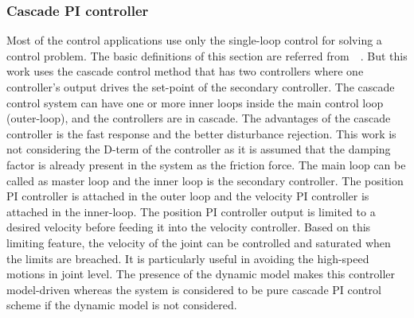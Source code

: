 \subsubsection*{Cascade PI controller}

Most of the control applications use only the single-loop control for solving a control problem. The basic definitions of this section are referred from~\cite{cascadedcontrol}~\cite{astrom1995pid}. But this work uses the cascade control method that has two controllers where one controller's output drives the set-point of the secondary controller. The cascade control system can have one or more inner loops inside the main control loop (outer-loop), and the controllers are in cascade. The advantages of the cascade controller is the fast response and the better disturbance rejection. This work is not considering the D-term of the controller as it is assumed that the damping factor is already present in the system as the friction force. The main loop can be called as master loop and the inner loop is the secondary controller. The position PI controller is attached in the outer loop and the velocity PI controller is attached in the inner-loop. The position PI controller output is limited to a desired velocity before feeding it into the velocity controller. Based on this limiting feature, the velocity of the joint can be controlled and saturated when the limits are breached. It is particularly useful in avoiding the high-speed motions in joint level. The presence of the dynamic model makes this controller model-driven whereas the system is considered to be pure cascade PI control scheme if the dynamic model is not considered. 

\begin{center}
\end{center}

